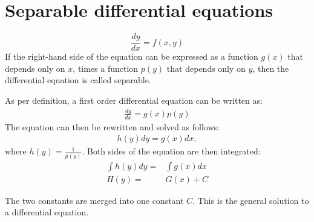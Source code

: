 \section{Separable differential equations} \label{SDE}
\begin{tcolorbox}[colback=blue!5!white,colframe=blue!75!black,title=Definition: Separable equation] 
    $$\frac{dy}{dx} = f(x,y)$$
    If the right-hand side of the equation can be expressed as   a function $g(x)$ that depends only on $x$, times a function $p(y)$ that depends only on $y$, then the differential equation is called separable.
   \end{tcolorbox}
As per definition, a first order differential equation can be written as:
\begin{align}
	\frac{dy}{dx}=g(x)p(y)
	\label{2_4}
\end{align}
The equation can then be rewritten and solved as follows:
\begin{align}
	h(y)dy=g(x)dx,
\end{align}
where $h(y) = \frac{1}{p(y)}$. Both sides of the equation are then integrated:
 \begin{align}
 	\int h(y)dy =&\int g(x)dx   \\
 	H(y)=&G(x)+C
 \end{align}
 
The two constants are merged into one constant $C$. This is the general solution to a differential equation. \citep{diffandcomplex}

